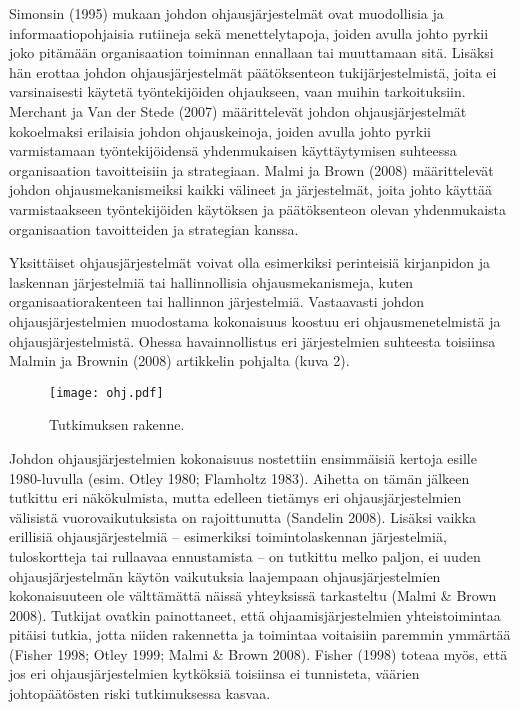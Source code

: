 \documentclass[12pt,a4paper,oneside,pdftex]{report}
\begin{document}
Simonsin (1995) mukaan johdon ohjausjärjestelmät ovat muodollisia ja informaatiopohjaisia rutiineja sekä menettelytapoja, joiden avulla johto pyrkii joko pitämään organisaation toiminnan ennallaan tai muuttamaan sitä. Lisäksi hän erottaa johdon ohjausjärjestelmät päätöksenteon tukijärjestelmistä, joita ei varsinaisesti käytetä työntekijöiden ohjaukseen, vaan muihin tarkoituksiin. Merchant ja Van der Stede (2007) määrittelevät johdon ohjausjärjestelmät kokoelmaksi erilaisia johdon ohjauskeinoja, joiden avulla johto pyrkii varmistamaan työntekijöidensä yhdenmukaisen käyttäytymisen suhteessa organisaation tavoitteisiin ja strategiaan. Malmi ja Brown (2008) määrittelevät johdon ohjausmekanismeiksi kaikki välineet ja järjestelmät, joita johto käyttää varmistaakseen työntekijöiden käytöksen ja päätöksenteon olevan yhdenmukaista organisaation tavoitteiden ja strategian kanssa. 

Yksittäiset ohjausjärjestelmät voivat olla esimerkiksi perinteisiä kirjanpidon ja laskennan järjestelmiä tai hallinnollisia ohjausmekanismeja, kuten organisaatiorakenteen tai hallinnon järjestelmiä. Vastaavasti johdon ohjausjärjestelmien muodostama kokonaisuus koostuu eri ohjausmenetelmistä ja ohjausjärjestelmistä. Ohessa havainnollistus eri järjestelmien suhteesta toisiinsa Malmin ja Brownin (2008) artikkelin pohjalta (kuva 2).

\begin{figure}[ht]
  \begin{center}
    \texttt{[image: ohj.pdf]}
    \caption{Tutkimuksen rakenne.}
    \label{fig:rakenne}
  \end{center}
\end{figure}

Johdon ohjausjärjestelmien kokonaisuus nostettiin ensimmäisiä kertoja esille 1980-luvulla (esim. Otley 1980; Flamholtz 1983). Aihetta on tämän jälkeen tutkittu eri näkökulmista, mutta edelleen tietämys eri ohjausjärjestelmien välisistä vuorovaikutuksista on rajoittunutta (Sandelin 2008). Lisäksi vaikka erillisiä ohjausjärjestelmiä – esimerkiksi toimintolaskennan järjestelmiä, tuloskortteja tai rullaavaa ennustamista – on tutkittu melko paljon, ei uuden ohjausjärjestelmän käytön vaikutuksia laajempaan ohjausjärjestelmien kokonaisuuteen ole välttämättä näissä yhteyksissä tarkasteltu (Malmi & Brown 2008). Tutkijat ovatkin painottaneet, että ohjaamisjärjestelmien yhteistoimintaa pitäisi tutkia, jotta niiden rakennetta ja toimintaa voitaisiin paremmin ymmärtää (Fisher 1998; Otley 1999; Malmi & Brown 2008). Fisher (1998) toteaa myös, että jos eri ohjausjärjestelmien kytköksiä toisiinsa ei tunnisteta, väärien johtopäätösten riski tutkimuksessa kasvaa.
\end{document}
